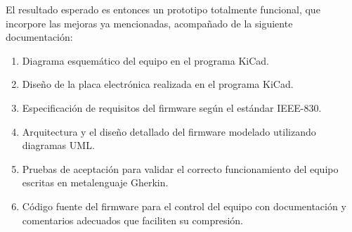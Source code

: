 El resultado esperado es entonces un prototipo totalmente funcional, que incorpore las mejoras ya mencionadas, acompañado de la siguiente documentación:

\begin{enumerate}
	\item Diagrama esquemático del equipo en el programa KiCad.
	\item Diseño de la placa electrónica realizada en el programa KiCad.
	\item Especificación de requisitos del firmware según el estándar IEEE-830.
	\item Arquitectura y el diseño detallado del firmware modelado utilizando diagramas UML.
	\item Pruebas de aceptación para validar el correcto funcionamiento del equipo escritas en metalenguaje Gherkin. 
	\item Código fuente del firmware para el control del equipo con documentación y comentarios adecuados que faciliten su compresión.
\end{enumerate}